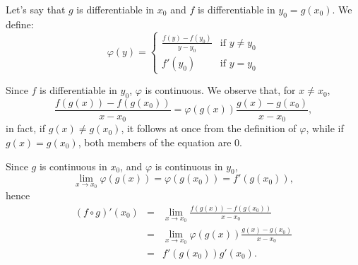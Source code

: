 \documentclass[12pt]{article}
\begin{document}
Let's say that $g$ is differentiable in $x_0$ and $f$ is differentiable in $y_0 = g(x_0)$. We define:
\[ \varphi(y) = \left \{ \begin{array}{ll}
\frac{f(y) - f(y_0)}{y-y_0} & \textrm{if $y \neq y_0$} \\
f'(y_0) & \textrm{if $y = y_0$}
\end{array} \right.
\]

Since $f$ is differentiable in $y_0$, $\varphi$ is continuous.
We observe that, for $x \neq x_0$,
\[ \frac{f(g(x))-f(g(x_0))}{x-x_0} = \varphi(g(x)) \frac{g(x) - g(x_0)}{x-x_0}, \]
in fact, if $g(x) \neq g(x_0)$, it follows at once from the definition of $\varphi$, while if $g(x) = g(x_0)$, both members of the equation are 0.

Since $g$ is continuous in $x_0$, and $\varphi$ is continuous in $y_0$,
\[ \lim_{x \to x_0} \varphi(g(x)) = \varphi(g(x_0)) = f'(g(x_0)), \]
hence
\begin{eqnarray*}
(f \circ g)'(x_0) &=& \lim_{x\to x_0} \frac{f(g(x))-f(g(x_0))}{x-x_0}  \\
  &=& \lim_{x\to x_0} \varphi(g(x)) \frac{g(x) - g(x_0)}{x-x_0}  \\
  &=& f'(g(x_0))g'(x_0). 
\end{eqnarray*}
\end{document}
